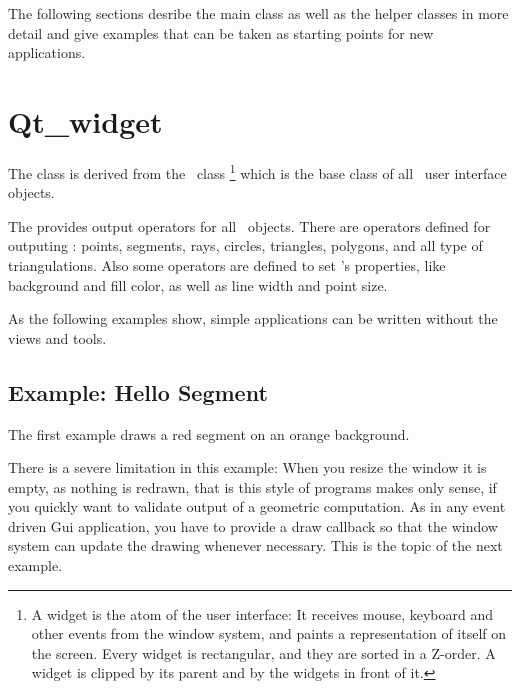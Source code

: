 The following sections desribe the main class as well as the helper classes
in more detail and give examples that can be taken as starting points for
new applications.


\section{Qt\_widget}
\label{Qt_widget}

The class  is derived from the \qt\ class %
\footnote{A widget is the atom of the user interface: It receives mouse, keyboard and other 
events from the window system, and paints a representation of itself on the 
screen. Every widget is rectangular, and they are sorted in a Z-order. A 
widget is clipped by its parent and by the widgets in front of it.} 
which is the base class of all \qt\ user interface objects. 


The  provides output operators for all \cgal\ objects. There are 
operators defined for outputing : points, segments, rays, circles, triangles, 
polygons, and all type of triangulations. Also some operators are defined to 
set 's properties, like background and fill color, as well as line
width and point size.

As the following examples show, simple applications can be written
without the views and tools.

\subsection{Example: Hello Segment}
The first example draws a red segment on an orange background.

There is a severe limitation in this example: When you resize the window it is empty, as nothing is
redrawn, that is this style of programs makes only sense, if you quickly want to validate output
of a geometric computation. As in any event driven {\sc Gui} application, you have to provide 
a draw callback so that the window system can update the drawing whenever necessary. This is the topic
of the next example.

% 

